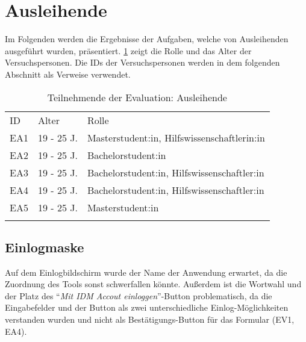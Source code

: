 \section{Ausleihende}
Im Folgenden werden die Ergebnisse der Aufgaben, welche von Ausleihenden ausgeführt wurden,
präsentiert. \ref{table:azwei} zeigt die Rolle und das Alter der Versuchspersonen. Die IDs der
Versuchspersonen werden in dem folgenden Abschnitt als Verweise verwendet.

\begin{table}[h]
        \centering
        \caption{Teilnehmende der Evaluation: Ausleihende}
        \begin{tabular}{lll}
                \arrayrulecolor{maincolor}\hline
                \sffamily\color{maincolor}ID & \sffamily\color{maincolor}Alter &
                \sffamily\color{maincolor}Rolle                                  \\
                \arrayrulecolor{maincolor}\hline
                EA1                          & 19 - 25 J.                      &
                Masterstudent:in, Hilfswissenschaftlerin:in                      \\
                EA2                          & 19 - 25 J.                      &
                Bachelorstudent:in                                               \\
                EA3                          & 19 - 25 J.                      &
                Bachelorstudent:in, Hilfswissenschaftler:in                      \\
                EA4                          & 19 - 25 J.                      &
                Bachelorstudent:in, Hilfswissenschaftler:in                      \\
                EA5                          & 19 - 25 J.                      &
                Masterstudent:in                                                 \\
                \arrayrulecolor{maincolor}\hline
        \end{tabular}
        \label{table:azwei}
\end{table}

\subsection{Einlogmaske}
Auf dem Einlogbildschirm wurde der Name der Anwendung erwartet, da die
Zuordnung des Tools sonst schwerfallen könnte. Außerdem ist die Wortwahl und der
Platz des \enquote{\textit{Mit IDM Accout einloggen}}-Button problematisch, da die
Eingabefelder und der Button als zwei unterschiedliche Einlog-Möglichkeiten verstanden
wurden und nicht als Bestätigungs-Button für das Formular (EV1, EA4).

